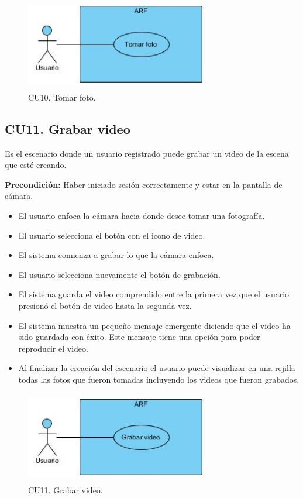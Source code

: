 \begin{figure}[!htbp]
	\centering
	\includegraphics[width=8cm,height=4cm]{imagenes/analisis/cu/tomar_foto.jpg}
	\caption{CU10. Tomar foto.}
	\label{fig:tomarfoto}
\end{figure} 

\subsection{CU11. Grabar video}\par
Es el escenario donde un usuario registrado puede grabar un video de la escena que esté creando.\par
\textbf{Precondición:} Haber iniciado sesión correctamente y estar en la pantalla de cámara.\par
\begin{itemize}
	\item El usuario enfoca la cámara hacia donde desee tomar una fotografía.
	\item El usuario selecciona el botón con el icono de video.
	\item El sistema comienza a grabar lo que la cámara enfoca.
	\item El usuario selecciona nuevamente el botón de grabación.
	\item El sistema guarda el video comprendido entre la primera vez que el usuario presionó el botón de video hasta la segunda vez.
	\item El sistema muestra un pequeño mensaje emergente diciendo que el video ha sido guardada con éxito. Este mensaje tiene una opción para poder reproducir el video.
	\item Al finalizar la creación del escenario el usuario puede visualizar en una rejilla todas las fotos que fueron tomadas incluyendo los videos que fueron grabados.
\end{itemize}

\begin{figure}[!htbp]
	\centering
	\includegraphics[width=8cm,height=4cm]{imagenes/analisis/cu/grabar_video.jpg}
	\caption{CU11. Grabar video.}
	\label{fig:grabarvideo}
\end{figure} 

